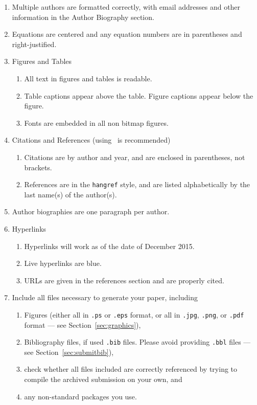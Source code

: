 \documentclass{wscpaperproc}
\theoremstyle{wsc}
\begin{document}
\begin{enumerate}
	\item Multiple authors are formatted correctly, with email addresses and other information in the Author Biography section.
	\item Equations are centered and any equation numbers are in parentheses and right-justified.
	\item Figures and Tables
	\begin{enumerate}
		\item All text in figures and tables is readable.
		\item Table captions appear above the table. Figure captions appear below the figure.
		\item Fonts are embedded in all non bitmap figures.
	\end{enumerate}
	\item Citations and References (using \BibTeX\ is recommended)
	\begin{enumerate}
		\item Citations are by author and year, and are enclosed in parentheses, not brackets.
		\item References are in the {\tt hangref} style, and are listed alphabetically by the last name(s) of the author(s).
	\end{enumerate}
	\item Author biographies are one paragraph per author.
	\item Hyperlinks
	\begin{enumerate}
		\item Hyperlinks will work as of the date of December 2015.
		\item Live hyperlinks are blue.
		\item URLs are given in the references section and are properly cited.
	\end{enumerate}
	\item Include all files necessary to generate your paper, including
	\begin{enumerate}
		\item Figures (either all in {\tt .ps} or {\tt .eps} format, or all in {\tt .jpg}, {\tt .png}, or {\tt .pdf} format --- see Section~\ref{sec:graphics}),
		\item Bibliography files, if used {\tt .bib} files. Please avoid providing {\tt .bbl} files --- see Section~\ref{sec:submitbib}),
		\item check whether all files included are correctly referenced by trying to compile the archived submission on your own, and
		\item any non-standard packages you use.
	\end{enumerate}
\end{enumerate}
\end{document}
